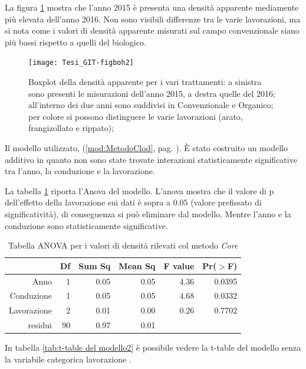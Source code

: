 \documentclass[11pt, a4paper, openright, titlepage, final, language = italian]{book}
\begin{document}
La figura \ref{fig:boxplotCore} mostra che l'anno 2015 \`e presenta
una densit\`a apparente mediamente pi\`u elevata dell'anno 2016. Non
sono visibili differenze tra le varie lavorazioni, ma si nota come i
valori di densit\`a apparente misurati sul campo convenzionale siano
pi\`u bassi rispetto a quelli del biologico.



\begin{figure}[hb]
  \centering
\texttt{[image: Tesi\_GIT-figboh2]}

\caption{Boxplot della densit\`a apparente per i vari trattamenti: 
  a sinistra sono presenti le misurazioni dell'anno 2015, a destra quelle del 2016; 
  all'interno dei due anni sono suddivisi in Convenzionale e Organico; 
  per colore si possono distinguere le varie lavorazioni (arato, frangizollato e rippato);
  }
  
  \label{fig:boxplotCore}
\end{figure}
\FloatBarrier


Il modello utilizzato, (\ref{mod:MetodoClod}, pag.
\pageref{mod:MetodoClod}). \`E stato costruito un modello additivo in
quanto non sono state trovate interazioni statisticamente
significative tra l'anno, la conduzione e la lavorazione.

La tabella \ref{tab:anova del modello} riporta l'Anova del
modello. L'anova mostra che il valore di p dell'effetto della lavorazione
sui dati \`e sopra a 0.05 (valore prefissato di significativit\`a), di
conseguenza si pu\`o eliminare dal modello. Mentre l'anno e la
conduzione sono statisticamente significative.


\begin{table}[ht]
\centering
\caption{Tabella ANOVA per i valori di densità rilevati col metodo \emph{Core}} 
\label{tab:anova del modello}
\begin{tabular}{rrrrrr}
  \hline
 & Df & Sum Sq & Mean Sq & F value & Pr($>$F) \\ 
  \hline
Anno & 1 & 0.05 & 0.05 & 4.36 & 0.0395 \\ 
  Conduzione & 1 & 0.05 & 0.05 & 4.68 & 0.0332 \\ 
  Lavorazione & 2 & 0.01 & 0.00 & 0.26 & 0.7702 \\ 
  residui & 90 & 0.97 & 0.01 &  &  \\ 
   \hline
\end{tabular}
\end{table}
In tabella \ref{tab:t-table del modello2} \`e possibile vedere la
t-table del modello senza la variabile categorica lavorazione
.
\end{document}
